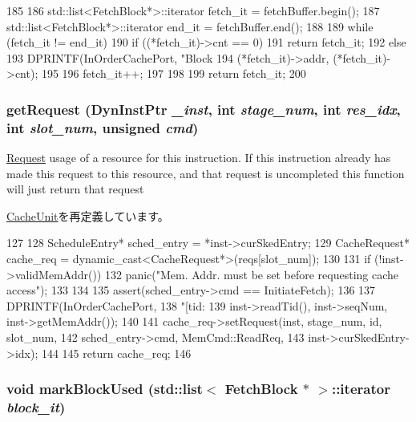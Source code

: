 \begin{DoxyCode}
185 {
186     std::list<FetchBlock*>::iterator fetch_it = fetchBuffer.begin();
187     std::list<FetchBlock*>::iterator end_it = fetchBuffer.end();
188 
189     while (fetch_it != end_it) {
190         if ((*fetch_it)->cnt == 0) {
191             return fetch_it;
192         } else {
193             DPRINTF(InOrderCachePort, "Block %
194                     (*fetch_it)->addr, (*fetch_it)->cnt);
195         }
196         fetch_it++;
197     }
198 
199     return fetch_it;
200 }
\end{DoxyCode}
\hypertarget{classFetchUnit_aae5ce84f94a1057d7f60172daf5d731d}{
\subsubsection[{getRequest}]{ getRequest ({\bf DynInstPtr} {\em \_\-inst}, \/  int {\em stage\_\-num}, \/  int {\em res\_\-idx}, \/  int {\em slot\_\-num}, \/  unsigned {\em cmd})}}
\label{classFetchUnit_aae5ce84f94a1057d7f60172daf5d731d}
\hyperlink{classRequest}{Request} usage of a resource for this instruction. If this instruction already has made this request to this resource, and that request is uncompleted this function will just return that request 

\hyperlink{classCacheUnit_aae5ce84f94a1057d7f60172daf5d731d}{CacheUnit}を再定義しています。


\begin{DoxyCode}
127 {
128     ScheduleEntry* sched_entry = *inst->curSkedEntry;
129     CacheRequest* cache_req = dynamic_cast<CacheRequest*>(reqs[slot_num]);
130 
131     if (!inst->validMemAddr()) {
132         panic("Mem. Addr. must be set before requesting cache access\n");
133     }
134 
135     assert(sched_entry->cmd == InitiateFetch);
136 
137     DPRINTF(InOrderCachePort,
138             "[tid:%
139             inst->readTid(), inst->seqNum, inst->getMemAddr());
140 
141     cache_req->setRequest(inst, stage_num, id, slot_num,
142                           sched_entry->cmd, MemCmd::ReadReq,
143                           inst->curSkedEntry->idx);
144 
145     return cache_req;
146 }
\end{DoxyCode}
\hypertarget{classFetchUnit_aa7abce4f82cf68e0c338953fb41e3fc8}{
\subsubsection[{markBlockUsed}]{\setlength{\rightskip}{0pt plus 5cm}void markBlockUsed ({\bf std::list}$<$ {\bf FetchBlock} $\ast$ $>$::iterator {\em block\_\-it})}}
\label{classFetchUnit_aa7abce4f82cf68e0c338953fb41e3fc8}



